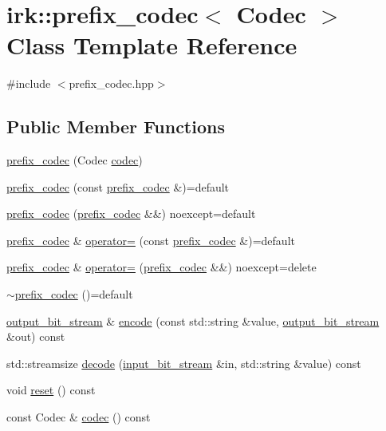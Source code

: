 \hypertarget{classirk_1_1prefix__codec}{}\section{irk\+:\+:prefix\+\_\+codec$<$ Codec $>$ Class Template Reference}
\label{classirk_1_1prefix__codec}


{\ttfamily \#include $<$prefix\+\_\+codec.\+hpp$>$}

\subsection*{Public Member Functions}
\begin{DoxyCompactItemize}
\item 
\mbox{\hyperlink{classirk_1_1prefix__codec_ae62df61eb37ba33832925eccd5c34bff}{prefix\+\_\+codec}} (Codec \mbox{\hyperlink{classirk_1_1prefix__codec_a4d7d970c8c39069aed29eed8e4af0ead}{codec}})
\item 
\mbox{\hyperlink{classirk_1_1prefix__codec_ac722dba7a56035e5a7504fe974c033b6}{prefix\+\_\+codec}} (const \mbox{\hyperlink{classirk_1_1prefix__codec}{prefix\+\_\+codec}} \&)=default
\item 
\mbox{\hyperlink{classirk_1_1prefix__codec_abd8429232a7ce5371b37d9e6b0a33472}{prefix\+\_\+codec}} (\mbox{\hyperlink{classirk_1_1prefix__codec}{prefix\+\_\+codec}} \&\&) noexcept=default
\item 
\mbox{\hyperlink{classirk_1_1prefix__codec}{prefix\+\_\+codec}} \& \mbox{\hyperlink{classirk_1_1prefix__codec_aba7104bb2d148c766cce482aa8c2aefa}{operator=}} (const \mbox{\hyperlink{classirk_1_1prefix__codec}{prefix\+\_\+codec}} \&)=default
\item 
\mbox{\hyperlink{classirk_1_1prefix__codec}{prefix\+\_\+codec}} \& \mbox{\hyperlink{classirk_1_1prefix__codec_a4baa5529105e188218c1b181bd5e37bf}{operator=}} (\mbox{\hyperlink{classirk_1_1prefix__codec}{prefix\+\_\+codec}} \&\&) noexcept=delete
\item 
\mbox{\hyperlink{classirk_1_1prefix__codec_aa356bea0689e43ea71a6d8ea91282cd3}{$\sim$prefix\+\_\+codec}} ()=default
\item 
\mbox{\hyperlink{classirk_1_1output__bit__stream}{output\+\_\+bit\+\_\+stream}} \& \mbox{\hyperlink{classirk_1_1prefix__codec_af560960a2c1b09d397a6696fc4204fcc}{encode}} (const std\+::string \&value, \mbox{\hyperlink{classirk_1_1output__bit__stream}{output\+\_\+bit\+\_\+stream}} \&out) const
\item 
std\+::streamsize \mbox{\hyperlink{classirk_1_1prefix__codec_a2425c1519ca2e5233b7b3e0354bc86f4}{decode}} (\mbox{\hyperlink{classirk_1_1input__bit__stream}{input\+\_\+bit\+\_\+stream}} \&in, std\+::string \&value) const
\item 
void \mbox{\hyperlink{classirk_1_1prefix__codec_afbc9b7767acb444e0cb8d9d4f6d83a23}{reset}} () const
\item 
const Codec \& \mbox{\hyperlink{classirk_1_1prefix__codec_a4d7d970c8c39069aed29eed8e4af0ead}{codec}} () const
\end{DoxyCompactItemize}



